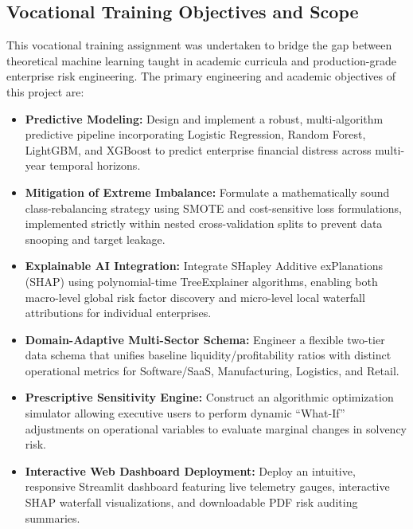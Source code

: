 \documentclass[11pt, a4paper]{article}
\begin{document}
\subsection{Vocational Training Objectives and Scope}
This vocational training assignment was undertaken to bridge the gap between theoretical machine learning taught in academic curricula and production-grade enterprise risk engineering. The primary engineering and academic objectives of this project are:
\begin{itemize}
    \item \textbf{Predictive Modeling:} Design and implement a robust, multi-algorithm predictive pipeline incorporating Logistic Regression, Random Forest, LightGBM, and XGBoost to predict enterprise financial distress across multi-year temporal horizons.
    \item \textbf{Mitigation of Extreme Imbalance:} Formulate a mathematically sound class-rebalancing strategy using SMOTE and cost-sensitive loss formulations, implemented strictly within nested cross-validation splits to prevent data snooping and target leakage.
    \item \textbf{Explainable AI Integration:} Integrate SHapley Additive exPlanations (SHAP) using polynomial-time TreeExplainer algorithms, enabling both macro-level global risk factor discovery and micro-level local waterfall attributions for individual enterprises.
    \item \textbf{Domain-Adaptive Multi-Sector Schema:} Engineer a flexible two-tier data schema that unifies baseline liquidity/profitability ratios with distinct operational metrics for Software/SaaS, Manufacturing, Logistics, and Retail.
    \item \textbf{Prescriptive Sensitivity Engine:} Construct an algorithmic optimization simulator allowing executive users to perform dynamic ``What-If'' adjustments on operational variables to evaluate marginal changes in solvency risk.
    \item \textbf{Interactive Web Dashboard Deployment:} Deploy an intuitive, responsive Streamlit dashboard featuring live telemetry gauges, interactive SHAP waterfall visualizations, and downloadable PDF risk auditing summaries.
\end{itemize}

\clearpage

\end{document}
